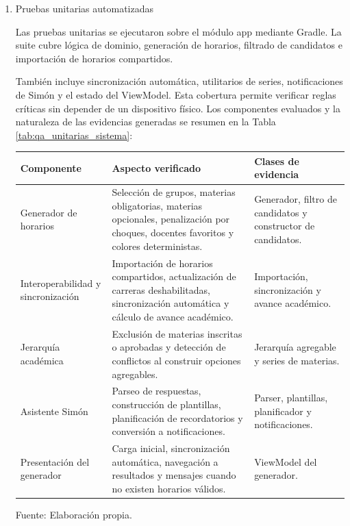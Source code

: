 \begin{enumerate}
  \item Pruebas unitarias automatizadas

Las pruebas unitarias se ejecutaron sobre el módulo app mediante Gradle. La suite cubre lógica de dominio, generación de horarios, filtrado de candidatos e importación de horarios compartidos.

También incluye sincronización automática, utilitarios de series, notificaciones de Simón y el estado del ViewModel. Esta cobertura permite verificar reglas críticas sin depender de un dispositivo físico. Los componentes evaluados y la naturaleza de las evidencias generadas se resumen en la Tabla \ref{tab:qa_unitarias_sistema}:

\begin{center}
\begin{minipage}{\linewidth}
\centering
\begin{tabularx}{\linewidth}{@{}p{3.4cm}>{\RaggedRight\arraybackslash}X>{\RaggedRight\arraybackslash}p{4.2cm}@{}}
\toprule
Componente & Aspecto verificado & Clases de evidencia \\
\midrule
Generador de horarios & Selección de grupos, materias obligatorias, materias opcionales, penalización por choques, docentes favoritos y colores deterministas. & Generador, filtro de candidatos y constructor de candidatos. \\
Interoperabilidad y sincronización & Importación de horarios compartidos, actualización de carreras deshabilitadas, sincronización automática y cálculo de avance académico. & Importación, sincronización y avance académico. \\
Jerarquía académica & Exclusión de materias inscritas o aprobadas y detección de conflictos al construir opciones agregables. & Jerarquía agregable y series de materias. \\
Asistente Simón & Parseo de respuestas, construcción de plantillas, planificación de recordatorios y conversión a notificaciones. & Parser, plantillas, planificador y notificaciones. \\
Presentación del generador & Carga inicial, sincronización automática, navegación a resultados y mensajes cuando no existen horarios válidos. & ViewModel del generador. \\
\bottomrule
\end{tabularx}
\label{tab:qa_unitarias_sistema}
Fuente: Elaboración propia.
\end{minipage}
\end{center}


\end{enumerate}
